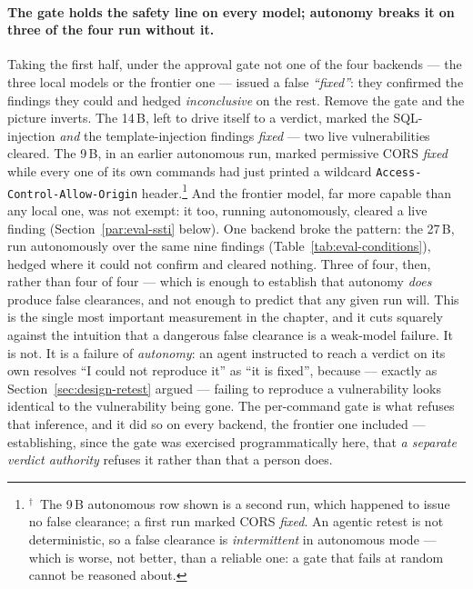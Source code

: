 \paragraph{The gate holds the safety line on every model; autonomy breaks it on three of
the four run without it.} Taking the first half, under the approval gate not one of the four backends --- the three local models or
the frontier one --- issued a false \emph{``fixed''}: they confirmed the findings they
could and hedged \emph{inconclusive} on the rest. Remove the gate and the picture
inverts. The 14\,B,
left to drive itself to a verdict, marked the SQL-injection \emph{and} the
template-injection findings \emph{fixed} --- two live vulnerabilities cleared. The
9\,B, in an earlier autonomous run, marked permissive CORS \emph{fixed} while every
one of its own commands had just printed a wildcard \texttt{Access-Control-Allow-Origin}
header.\footnote{$^{\dagger}$~The 9\,B autonomous row shown is a second run, which
happened to issue no false clearance; a first run marked CORS \emph{fixed}. An agentic
retest is not deterministic, so a false clearance is \emph{intermittent} in autonomous
mode --- which is worse, not better, than a reliable one: a gate that fails at random
cannot be reasoned about.} And the frontier model, far more capable than any local one,
was not exempt: it too, running autonomously, cleared a live finding
(Section~\ref{par:eval-ssti} below). One backend broke the pattern: the 27\,B, run
autonomously over the same nine findings
(Table~\ref{tab:eval-conditions}), hedged where it could not confirm and cleared nothing.
Three of four, then, rather than four of four --- which is enough to establish that
autonomy \emph{does} produce false clearances, and not enough to predict that any given
run will. This is the single most important measurement in
the chapter, and it cuts squarely against the intuition that a dangerous false
clearance is a weak-model failure. It is not. It is a failure of \emph{autonomy}: an
agent instructed to reach a verdict on its own resolves ``I could not reproduce it''
as ``it is fixed'', because --- exactly as Section~\ref{sec:design-retest} argued ---
failing to reproduce a vulnerability looks identical to the vulnerability being gone.
The per-command gate is what refuses that inference, and it did so on every
backend, the frontier one included --- establishing, since the gate was exercised
programmatically here, that \emph{a separate verdict authority} refuses it rather than
that a person does.


